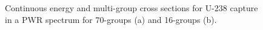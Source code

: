 \begin{figure}
\begin{subfigure}{\textwidth}
  \caption{}
\end{subfigure}
\caption[Uranium-238 capture cross section]{Continuous energy and multi-group cross sections for U-238 capture in a PWR spectrum for 70-groups (a) and 16-groups (b).}
\label{fig:pwr-ce-mg-xs}
\end{figure}

